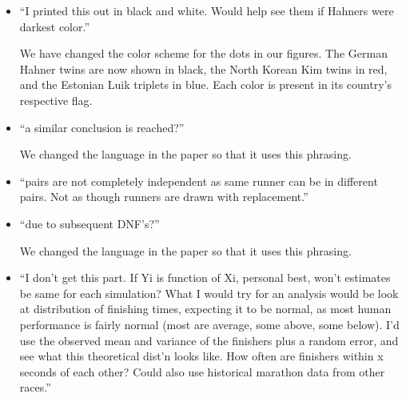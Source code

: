 \documentclass[12pt]{article}
\begin{document}
\begin{itemize}





\item ``I printed this out in black and white. Would help see them if
  Hahners were darkest color.''

  We have changed the color scheme for the dots in our figures.  The
  German Hahner twins are now shown in black, the North Korean Kim
  twins in red, and the Estonian Luik triplets in blue.  Each color is
  present in its country's respective flag.

\item ``a similar conclusion is reached?''

  We changed the language in the paper so that it uses this phrasing.

  \item ``pairs are not completely independent as same runner can be in
  different pairs. Not as though runners are drawn with replacement.''

\item ``due to subsequent DNF's?''

  We changed the language in the paper so that it uses this phrasing.
  
\item ``I don't get this part. If Yi is function of Xi, personal best,
  won't estimates be same for each simulation?  What I would try for
  an analysis would be look at distribution of finishing times,
  expecting it to be normal, as most human performance is fairly
  normal (most are average, some above, some below). I'd use the
  observed mean and variance of the finishers plus a random error, and
  see what this theoretical dist'n looks like. How often are finishers
  within x seconds of each other? Could also use historical marathon
  data from other races.''


\end{itemize}
\end{document}
